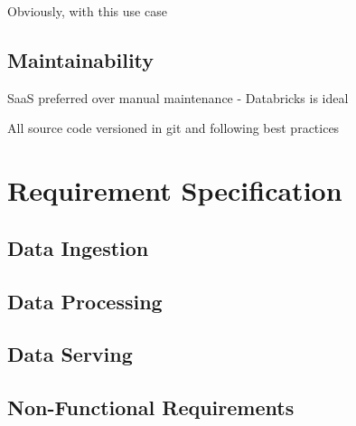 Obviously, with this use case

\subsection{Maintainability}

SaaS preferred over manual maintenance - Databricks is ideal

All source code versioned in git and following best practices




\section{Requirement Specification}

\subsection{Data Ingestion}

\subsection{Data Processing}

\subsection{Data Serving}

\subsection{Non-Functional Requirements}
